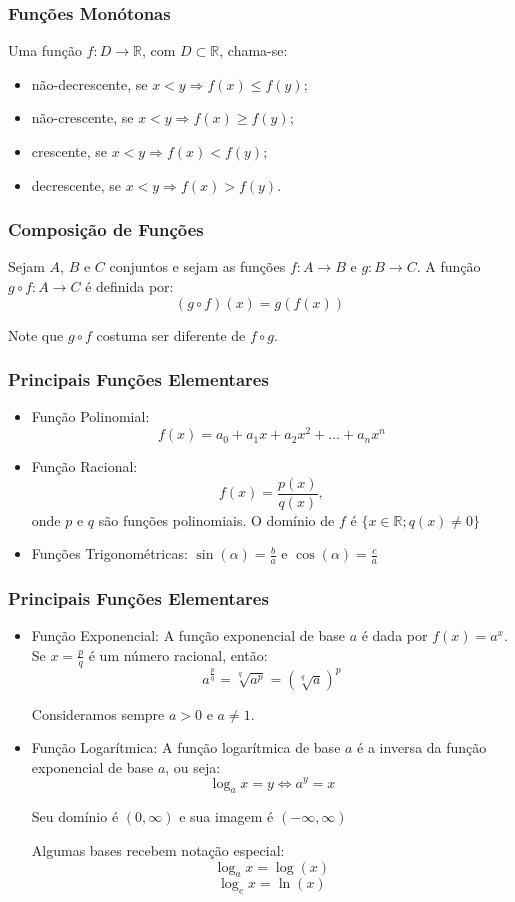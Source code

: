 \documentclass[hyperref={pdfpagelabels=false}]{beamer}
\begin{document}
\begin{frame}
\frametitle{Funções Monótonas}

Uma função $f:D \rightarrow \mathbb{R}$, com $D \subset \mathbb{R}$, chama-se:
\begin{itemize}
	\item não-decrescente, se $x<y \Rightarrow f(x) \leq f(y)$;
	\item não-crescente, se $x<y \Rightarrow f(x) \geq f(y)$;
	\item crescente, se $x<y \Rightarrow f(x) < f(y)$;
	\item decrescente, se $x<y \Rightarrow f(x) > f(y)$.
\end{itemize}

\end{frame}

\begin{frame}
\frametitle{Composição de Funções}
Sejam $A$, $B$ e $C$ conjuntos e sejam as funções $f:A \rightarrow B$ e $g: B \rightarrow C$. A função $ g \circ f : A \rightarrow C$ é definida por:
$$(g \circ f)(x) = g(f(x))$$

Note que $g \circ f$ costuma ser diferente de $ f \circ g$.

\end{frame}

\begin{frame}
\frametitle{Principais Funções Elementares}

\begin{itemize}
 \item Função Polinomial: \pause $$f(x) = a_0+a_1x+a_2x^2+\dots+a_nx^n$$ \pause
 \item Função Racional: \pause $$f(x) = \frac{p(x)}{q(x)},$$ onde $p$ e $q$ são funções polinomiais. O domínio de $f$ é $\{x \in \mathbb{R}; q(x) \neq 0 \}$ \pause
 \item Funções Trigonométricas: \pause $\sin (\alpha) = \displaystyle \frac{b}{a}$ e $\cos(\alpha) = \displaystyle \frac{c}{a}$
\end{itemize}

\end{frame}


\begin{frame}
\frametitle{Principais Funções Elementares}

\begin{itemize}
 \item Função Exponencial: \pause A função exponencial de base $a$ é dada por $f(x) = a^{x}$. Se $x = \frac{p}{q}$ é um número racional, então:
$$a^{\frac{p}{q}} = \sqrt[q]{a^p} = (\sqrt[q]{a})^{p}$$

Consideramos sempre $a>0$ e $a \neq 1$.

 \item Função Logarítmica: \pause A função logarítmica de base $a$ é a inversa da função exponencial de base $a$, ou seja:
$$\log_{a}x = y \Leftrightarrow a^{y} = x$$

Seu domínio é $(0, \infty)$ e sua imagem é $(- \infty, \infty)$

Algumas bases recebem notação especial:
$$\log_{a}x = \log(x)$$
$$\log_{e}x = \ln(x)$$
\end{itemize}

\end{frame}
\end{document}
